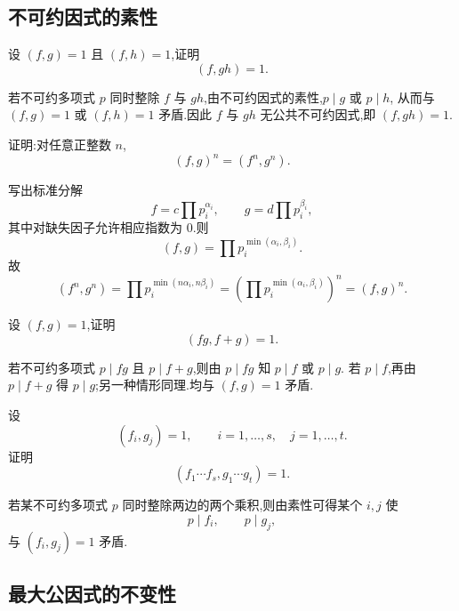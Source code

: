 \subsection{不可约因式的素性}

\begin{example}
设 $(f,g)=1$ 且 $(f,h)=1$,证明
\[
  (f,gh)=1.
\]
\end{example}
\exampleblank

\begin{solution}
若不可约多项式 $p$ 同时整除 $f$ 与 $gh$,由不可约因式的素性,$p\mid g$ 或 $p\mid h$,
从而与 $(f,g)=1$ 或 $(f,h)=1$ 矛盾.因此 $f$ 与 $gh$ 无公共不可约因式,即 $(f,gh)=1$.
\end{solution}

\begin{example}
证明:对任意正整数 $n$,
\[
  (f,g)^n=(f^n,g^n).
\]
\end{example}
\exampleblank

\begin{solution}
写出标准分解
\[
  f=c\prod p_i^{\alpha_i},
  \qquad
  g=d\prod p_i^{\beta_i},
\]
其中对缺失因子允许相应指数为 $0$.则
\[
  (f,g)=\prod p_i^{\min(\alpha_i,\beta_i)}.
\]
故
\[
  (f^n,g^n)
  =\prod p_i^{\min(n\alpha_i,n\beta_i)}
  =\left(\prod p_i^{\min(\alpha_i,\beta_i)}\right)^n
  =(f,g)^n.
\]
\end{solution}

\begin{example}
设 $(f,g)=1$,证明
\[
  (fg,f+g)=1.
\]
\end{example}
\exampleblank

\begin{solution}
若不可约多项式 $p\mid fg$ 且 $p\mid f+g$,则由 $p\mid fg$ 知 $p\mid f$ 或 $p\mid g$.
若 $p\mid f$,再由 $p\mid f+g$ 得 $p\mid g$;另一种情形同理.均与 $(f,g)=1$ 矛盾.
\end{solution}

\begin{example}
设
\[
  (f_i,g_j)=1,
  \qquad
  i=1,\ldots,s,\quad j=1,\ldots,t.
\]
证明
\[
  (f_1\cdots f_s,g_1\cdots g_t)=1.
\]
\end{example}
\exampleblank

\begin{solution}
若某不可约多项式 $p$ 同时整除两边的两个乘积,则由素性可得某个 $i,j$ 使
\[
  p\mid f_i,
  \qquad
  p\mid g_j,
\]
与 $(f_i,g_j)=1$ 矛盾.
\end{solution}

\subsection{最大公因式的不变性}

